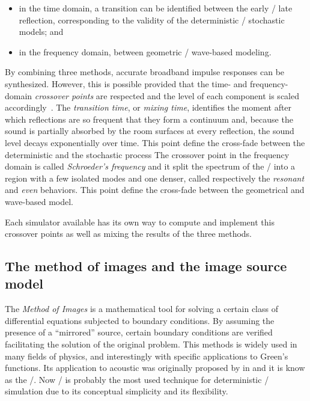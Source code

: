 \begin{itemize}
    \item in the time domain, a transition can be identified between the early \vs/ late reflection, corresponding to the validity of the deterministic \vs/ stochastic models; and
    \item in the frequency domain, between geometric \vs/ wave-based modeling.
\end{itemize}

By combining three methods, accurate broadband impulse responses can be synthesized.
However, this is possible provided that the time- and frequency-domain
\textit{crossover points} are respected and the level of each component is scaled accordingly~.
The \textit{transition time}, or \textit{mixing time}, identifies the moment after which reflections are so frequent that they form a continuum and,
because the sound is partially absorbed by the room surfaces at every reflection,
the sound level decays exponentially over time.
This point define the cross-fade between the deterministic and the stochastic process
The crossover point in the frequency domain is called \textit{Schroeder's frequency}
and it split the spectrum of the \RIR/ into a region with a few isolated modes and one denser,
called respectively the \textit{resonant} and \textit{even} behaviors.
This point define the cross-fade between the geometrical and wave-based model.

Each simulator available has its own way to compute and implement this crossover points as well as mixing the results of the three methods.

\subsection{The method of images and the image source model}\label{subsec:acoustics:ism}
The \textit{Method of Images} is a mathematical tool for solving a certain class of differential equations subjected to boundary conditions.
By assuming the presence of a ``mirrored'' source, certain boundary conditions are verified facilitating the solution of the original problem.
This methods is widely used in many fields of physics, and interestingly with specific applications to Green's functions.
Its application to acoustic was originally proposed by \citeauthor{allen1979image} in  and it is know as the \ISMdef/.
Now \ISM/ is probably the most used technique for deterministic \RIR/ simulation due to its conceptual simplicity and its flexibility.


